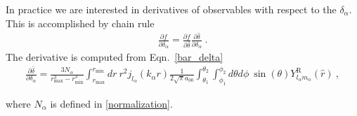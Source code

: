 \documentclass[11pt, oneside]{article}   	%
\newcommand{\sph}[2]{Y^\text{R}_{l_#1 m_#1}(\hat{#2})}
\begin{document}
In practice we are interested in derivatives of observables with respect to the $\delta_\alpha$. This is accomplished by chain rule 
\begin{align}
\frac{\partial f}{\partial \delta_\alpha}= \frac{\partial f}{\partial \bar{\delta}} \frac{\partial \bar{\delta}}{\partial \delta_\alpha}~.
\end{align} 
The derivative is computed from Eqn.~\ref{bar_delta}
\begin{align}
\frac{\partial \bar{\delta} }{ \partial \delta_\alpha}=
\frac{3 N_\alpha}{r_\text{max}^3 - r_\text{min}^3} \int_{r_\text{max}}^ {r_\text{min} }dr ~ r^2 j_{l_\alpha}(k_\alpha r)  \frac{1}{2\sqrt{\pi} a_{00}}  \int_{\theta_1}^{\theta_2 } \int_{\phi_1}^{\phi_2} d\theta d \phi ~\sin(\theta)\sph{\alpha}{r}~,
\end{align}

where $N_\alpha$ is defined in \eqref{normalization}.

 
\end{document}
